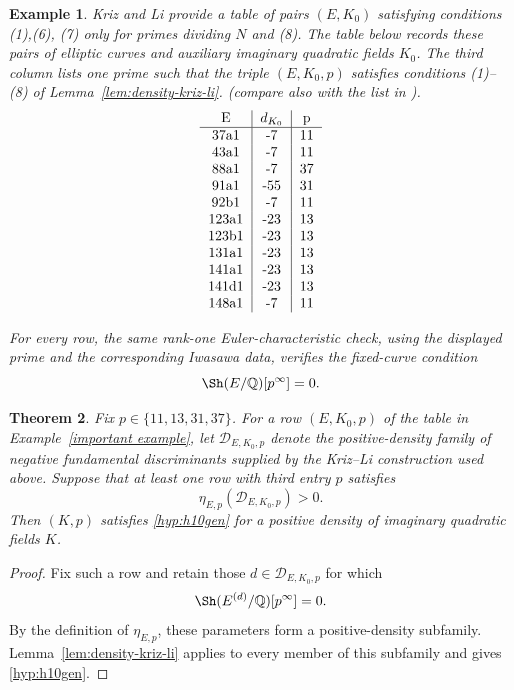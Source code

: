 \documentclass[12pt]{amsart}
\newtheorem{theorem}{Theorem}[section]
\newtheorem{example}[theorem]{Example}
\newcommand{\Q}{\mathbb{Q}}
\numberwithin{equation}{section}
\begin{document}
\begin{example}
Kriz and Li provide a table of pairs $(E,K_0)$ satisfying conditions (1),(6), (7) only for primes dividing $N$ and (8). The table below records these pairs of elliptic curves and auxiliary imaginary quadratic fields $K_0$. The third column lists one prime such that the triple $(E,K_0,p)$ satisfies conditions (1)--(8) of Lemma~\ref{lem:density-kriz-li}.
(compare also with the list in \cite[Example 6.1]{kriz-li}).
\newline
   \[ \begin{tabular}{c|c|c}
        E&$ d_{K_0}$ &p \\\hline
         37a1&-7&11\\
         43a1&-7&11\\
         88a1&-7&37\\
         91a1&-55&31\\
         92b1&-7&11\\
         123a1&-23&13\\
         123b1&-23&13\\
         131a1&-23&13\\
         141a1&-23&13\\
         141d1&-23&13\\
         148a1&-7&11\\
         
    \end{tabular}
    \]

For every row, the same rank-one Euler-characteristic check, using the displayed prime and the corresponding Iwasawa data, verifies the fixed-curve condition
\[
    \Sh(E/\Q)[p^\infty]=0.
\]
\end{example}

\begin{theorem}\label{lastthm1}
Fix $p\in\{11,13,31,37\}$. For a row $(E,K_0,p)$ of the table in Example~\ref{important example}, let $\mathcal D_{E,K_0,p}$ denote the positive-density family of negative fundamental discriminants supplied by the Kriz--Li construction used above. Suppose that at least one row with third entry $p$ satisfies
\[
    \eta_{E,p}(\mathcal D_{E,K_0,p})>0.
\]
Then $(K,p)$ satisfies \eqref{hyp:h10gen} for a positive density of imaginary quadratic fields $K$.
\end{theorem}
\begin{proof}
Fix such a row and retain those $d\in\mathcal D_{E,K_0,p}$ for which
\[
    \Sh(E^{(d)}/\Q)[p^\infty]=0.
\]
By the definition of $\eta_{E,p}$, these parameters form a positive-density subfamily. Lemma~\ref{lem:density-kriz-li} applies to every member of this subfamily and gives \eqref{hyp:h10gen}.
\end{proof}
\end{document}
